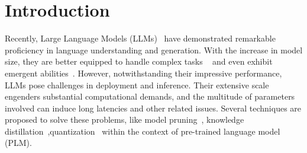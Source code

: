\documentclass{article}
\begin{document}
\section{Introduction}

Recently, Large Language Models (LLMs)~\cite{openai2023gpt4,touvron2023llama,thoppilan2022lamda,scao2022bloom,xue2020mt5,vicuna2023,zeng2022glm} have demonstrated remarkable proficiency in language understanding and generation. With the increase in model size, they are better equipped to handle complex tasks ~\cite{brown2020language,chowdhery2022palm,wei2022chain,wu2020biased} and even exhibit emergent abilities~\cite{weiemergent}. However, notwithstanding their impressive performance, LLMs pose challenges in deployment and inference. Their extensive scale engenders substantial computational demands, and the multitude of parameters involved can induce long latencies and other related issues. 
Several techniques are proposed to solve these problems, like model pruning~\cite{wang2019structured,xia2022structured,zafrir2021prune,kurtic2022optimal}, knowledge distillation~\cite{sun2019patient,pan2020meta,sun-etal-2020-contrastive},quantization~\cite{bai2020binarybert,frantar2022gptq} within the context of pre-trained language model (PLM). 



\end{document}
